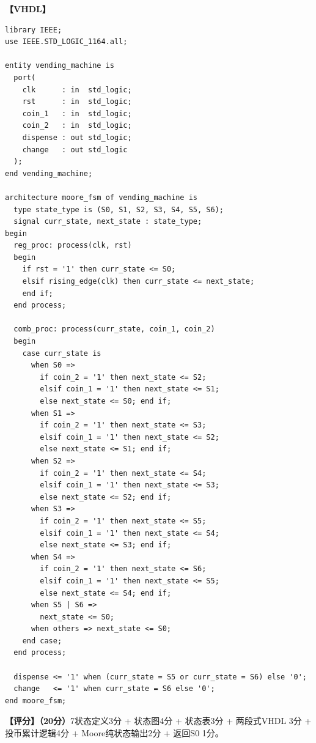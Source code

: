 \textbf{【VHDL】}
\begin{lstlisting}
library IEEE;
use IEEE.STD_LOGIC_1164.all;

entity vending_machine is
  port(
    clk      : in  std_logic;
    rst      : in  std_logic;
    coin_1   : in  std_logic;
    coin_2   : in  std_logic;
    dispense : out std_logic;
    change   : out std_logic
  );
end vending_machine;

architecture moore_fsm of vending_machine is
  type state_type is (S0, S1, S2, S3, S4, S5, S6);
  signal curr_state, next_state : state_type;
begin
  reg_proc: process(clk, rst)
  begin
    if rst = '1' then curr_state <= S0;
    elsif rising_edge(clk) then curr_state <= next_state;
    end if;
  end process;

  comb_proc: process(curr_state, coin_1, coin_2)
  begin
    case curr_state is
      when S0 =>
        if coin_2 = '1' then next_state <= S2;
        elsif coin_1 = '1' then next_state <= S1;
        else next_state <= S0; end if;
      when S1 =>
        if coin_2 = '1' then next_state <= S3;
        elsif coin_1 = '1' then next_state <= S2;
        else next_state <= S1; end if;
      when S2 =>
        if coin_2 = '1' then next_state <= S4;
        elsif coin_1 = '1' then next_state <= S3;
        else next_state <= S2; end if;
      when S3 =>
        if coin_2 = '1' then next_state <= S5;
        elsif coin_1 = '1' then next_state <= S4;
        else next_state <= S3; end if;
      when S4 =>
        if coin_2 = '1' then next_state <= S6;
        elsif coin_1 = '1' then next_state <= S5;
        else next_state <= S4; end if;
      when S5 | S6 =>
        next_state <= S0;
      when others => next_state <= S0;
    end case;
  end process;

  dispense <= '1' when (curr_state = S5 or curr_state = S6) else '0';
  change   <= '1' when curr_state = S6 else '0';
end moore_fsm;
\end{lstlisting}

\textbf{【评分】（20分）}7状态定义3分 + 状态图4分 + 状态表3分 + 两段式VHDL 3分 + 投币累计逻辑4分 + Moore纯状态输出2分 + 返回S0 1分。
